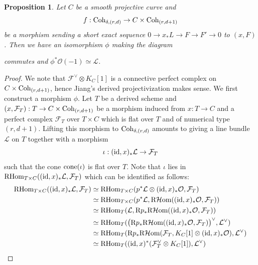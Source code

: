 \documentclass[10pt]{amsart}
\newcommand{\BP}{\mathbb{P}}
\newcommand{\R}{\textnormal{R}}
\newcommand{\CO}{\mathcal{O}}
\newcommand{\CL}{\mathcal{L}}
\newcommand{\CF}{\mathcal{F}}
\newcommand{\Coh}{\textnormal{Coh}}
\newcommand{\RHom}{\textnormal{RHom}}
\newcommand{\RHHom}{\textnormal{R}\mathcal{H}\textnormal{om}}
\newcommand{\cone}{\textnormal{cone}}
\newcommand{\id}{\textnormal{id}}
\newcommand{\+}{{}^+}
\newtheorem {proposition}[theorem]{Proposition}
\theoremstyle{definition}
\theoremstyle {definition}
\theoremstyle {definition}
\begin{document}
\begin{proposition}
    Let $C$ be a smooth projective curve and
    $$f:\Coh_{\delta, (r,d)}\rightarrow C\times \Coh_{(r,d+1)}
    $$
    be a morphism sending a short exact sequence $0\rightarrow x_*L\rightarrow F\rightarrow F'\rightarrow 0$ to $(x,F)$. Then we have an isomorphism $\phi$ making the diagram 
    \begin{center}
\end{center}
commutes and $\phi^*\CO(-1)\simeq \CL$.
\end{proposition}
\begin{proof}
    We note that $\CF^\vee\otimes K_C[1]$ is a connective perfect complex on $C\times \Coh_{(r,d+1)}$, hence Jiang's derived projectivization makes sense. We first construct a morphism $\phi$. Let $T$ be a derived scheme and $(x,\CF_T):T\rightarrow C\times \Coh_{(r,d+1)}$ be a morphism induced from $x:T\rightarrow C$ and a perfect complex $\CF_T$ over $T\times C$ which is flat over $T$ and of numerical type $(r,d+1)$. Lifting this morphism to $\Coh_{\delta, (r,d)}$ amounts to giving a line bundle $\CL$ on $T$ together with a morphism 
    \begin{equation}\label{eq: relative SES}
        \iota:(\id,x)_*\CL\rightarrow \CF_T
    \end{equation}
    such that the cone $\cone(\iota)$ is flat over $T$. Note that $\iota$ lies in $\RHom_{T\times C}((\id,x)_*\CL,\CF_T)$ which can be identified as follows:
    \begin{equation}\label{eq: long identification}
    \begin{aligned}
        \RHom_{T\times C}((\id,x)_*\CL,\CF_T)&
        \simeq \RHom_{T\times C}(p^*\CL\otimes (\id,x)_*\CO, \CF_T)\\
        &\simeq \RHom_{T\times C}(p^*\CL, \RHHom((\id,x)_*\CO,\CF_T))\\
        &\simeq \RHom_T(\CL, \R p_*\RHHom((\id,x)_*\CO,\CF_T))\\
        &\simeq \RHom_T(\big(\R p_*\RHHom((\id,x)_*\CO,\CF_T)\big)^\vee, \CL^\vee)\\
        &\simeq \RHom_T(\R p_*\RHHom(\CF_T, K_C[1]\otimes (\id,x)_*\CO),\CL^\vee)\\
        &\simeq \RHom_T((\id,x)^*(\CF_T^\vee\otimes K_C[1]),\CL^\vee)\\

\end{aligned}
\end{equation}
\end{proof}
\end{document}
